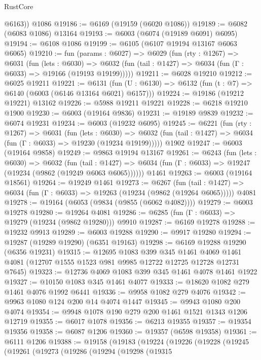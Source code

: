 \begin{lexlean}{RustCore}
\begin{coremodule}
        @6163))
    @1086
@19186 := @6169 (@19159 (@6020 @1086))
@19189 := @6082 (@6083 @1086) @13164
@19193 := @6003 (@6074 (@19189 @6091) @6095)
@19194 := @6108 @1086
@19199 := @6105 (@6107 @19194 @13167 @6063 @6065)
@19210 := fun (params : @6027) =>
  @6029
    (fun (rty : @1267) =>
    @6031
      (fun (lets : @6030) =>
      @6032 (fun (tail : @1427) => @6034 (fun (Γ : @6033) => @19166 (@19193 @19199)))))
@19211 := @6028 @19210
@19212 := @6025 @19211
@19221 := @6131
    (fun (U : @6130) => @6132 (fun (t : @7) => @6140 (@6003 (@6146 @13164 @6021) @6157)))
@19224 := @19186 (@19212 @19221) @13162
@19226 := @5988 @19211 @19221
@19228 := @6218 @19210 @1900
@19230 := @6003 (@19164 @9836)
@19231 := @19189 @9839
@19232 := @6074 @19231
@19234 := @6003 (@19232 @6095)
@19245 := @6221
    (fun (rty : @1267) =>
    @6031
      (fun (lets : @6030) =>
      @6032 (fun (tail : @1427) => @6034 (fun (Γ : @6033) => @19230 (@19234 @19199)))))
    @1902
@19247 := @6003 (@19164 @9858)
@19249 := @9863 @19194 @13167
@19261 := @6243
    (fun (lets : @6030) =>
    @6032
      (fun (tail : @1427) =>
      @6034 (fun (Γ : @6033) => @19247 (@19234 (@9862 (@19249 @6063 @6065))))))
    @1461
@19263 := @6003 (@19164 @18561)
@19264 := @19249 @1461
@19273 := @6267
    (fun (tail : @1427) => @6034 (fun (Γ : @6033) => @19263 (@19234 (@9862 (@19264 @6065)))))
    @4081
@19278 := @19164 (@6053 (@9834 (@9855 (@6062 @4082))))
@19279 := @6003 @19278
@19280 := @19264 @4081
@19286 := @6285 (fun (Γ : @6033) => @19279 (@19234 (@9862 @19280))) @9910
@19287 := @6169 @19278
@19288 := @19232 @9913
@19289 := @6003 @19288
@19290 := @9917 @19280
@19294 := @19287 (@19289 @19290) (@6351 @19163)
@19298 := @6169 @19288 @19290 (@6356 @19231)
@19315 := @12695
    @1083
    @399
    @345
    @1461
    @4069
    @1461
    @4081
    (@12707 @1555 @1523 @981 @9985 @12722 @12725 @12728 @12731 @7645)
@19323 := @12736 @4069 @1083 @399 @345 @1461 @4078 @1461 @1922
@19327 := @10150 @1083 @345 @1461 @4077
@19333 := @18620 @1082 @279 @1461 @4076 @1992 @6441
@19336 := @9958 @1082 @279 @4076
@19342 := @9963 @1080 @124 @200 @14 @4074 @1447
@19345 := @9943 @1080 @200 @4074
@19354 := @9948 @1078 @190 @279 @200 @1461 @1521 @1343 @1206 @12719
@19355 := @6017 @1078
@19356 := @6213 @19355
@19357 := @19354 @19356
@19358 := @6087 @1206
@19360 := @19357 (@6598 @19358)
@19361 := @6111 @1206
@19388 := @19158
    (@19183
      (@19224
        (@19226
          (@19228
            (@19245
              (@19261
                (@19273
                  (@19286
                    (@19294
                      (@19298
                        (@19315

\end{coremodule}
\end{lexlean}
